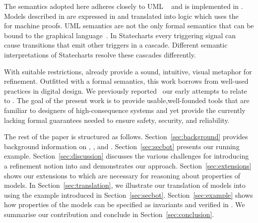 The semantics adopted here adheres closely to UML \Statecharts~\cite{Alexandre} and is implemented in \iUMLB.
 Models described in \Statecharts are expressed in \SCXML and
 translated into \EventB logic which uses the \Rodin~\cite{abrial10:_rodin} for
 machine proofs.  UML \Statechart semantics are not the only formal
 semantics that can be bound to the \Statechart graphical
 language~\cite{Eshuis_2009}.  In Statecharts every triggering signal
 can cause transitions that emit other triggers in a cascade.
 Different semantic interpretations of Statecharts resolve these
 cascades differently.  
%

With suitable restrictions, \Statecharts already provide a sound,
intuitive, visual metaphor for refinement. Outfitted with a formal
semantics, this work borrows from well-used \Statechart practices in
digital design.  We previously reported~\cite{Morris_2016} our early 
attempts to relate \Statecharts to \EventB. The goal of the present 
work is to provide usable,well-founded tools that are familiar to 
designers of high-consequence systems and yet provide the currently 
lacking formal guarantees needed to ensure safety, security, and reliability.


The rest of the paper is structured as follows.  Section~\ref{sec:background} provides background information on \SCXML, \EventB, and \iUMLB.  Section~\ref{sec:secbot} presents our running example.  Section~\ref{sec:discussion} discusses the various challenges for introducing a refinement notion into \SCXML and demonstrates our approach.  Section~\ref{sec:extensions} shows our extensions to \SCXML which are necessary for reasoning about properties of \SCXML models.  In Section~\ref{sec:translation}, we illustrate our translation of \SCXML models into \EventB using the example introduced in Section~\ref{sec:secbot}.  Section~\ref{sec:example} shows how properties of the \SCXML models can be specified as invariants and verified in \EventB.  We summarise our contribution and conclude in Section~\ref{sec:conclusion}.

